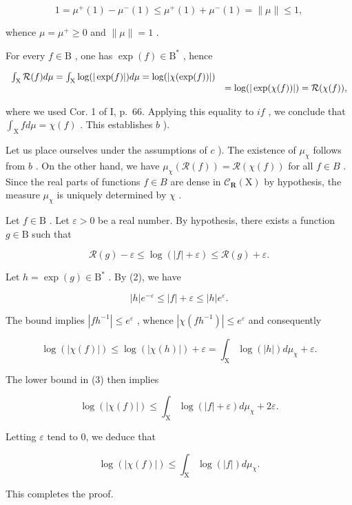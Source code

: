 \[
1 = \mu^ {+} (1) - \mu^ {-} (1) \leqslant \mu^ {+} (1) + \mu^ {-} (1) = \| \mu \| \leqslant 1,
\]

whence \(\mu = \mu^{+} \geqslant 0\) and \(\|\mu\| = 1\) .

For every \(f \in \mathrm{B}\) , one has \(\exp(f) \in \mathrm{B}^*\) , hence

\[
\begin{array}{r l} \int_ {\mathrm{X}} \mathcal {R} (f) d \mu = \int_ {\mathrm{X}} \log (| \exp (f) |) d \mu = \log (| \chi (\exp (f)) |) \\ & = \log (| \exp (\chi (f)) |) = \mathcal {R} (\chi (f)), \end{array}
\]

where we used Cor. 1 of I, p.~66. Applying this equality to \(if\) , we conclude that \(\int_{\mathrm{X}} f d\mu = \chi(f)\) . This establishes \(b\) ).

Let us place ourselves under the assumptions of \(c\) ). The existence of \(\mu_{\chi}\) follows from \(b\) . On the other hand, we have \(\mu_{\chi}(\mathcal{R}(f)) = \mathcal{R}(\chi(f))\) for all \(f \in B\) . Since the real parts of functions \(f \in B\) are dense in \(\mathcal{C}_{\mathbf{R}}(\mathrm{X})\) by hypothesis, the measure \(\mu_{\chi}\) is uniquely determined by \(\chi\) .

Let \(f \in \mathrm{B}\) . Let \(\varepsilon > 0\) be a real number. By hypothesis, there exists a function \(g \in \mathrm{B}\) such that

\[
\mathcal {R} (g) - \varepsilon \leqslant \log (| f | + \varepsilon) \leqslant \mathcal {R} (g) + \varepsilon .\tag{2}
\]

Let \(h = \exp(g) \in \mathrm{B}^*\) . By (2), we have

\[
| h | e ^ {- \varepsilon} \leqslant | f | + \varepsilon \leqslant | h | e ^ {\varepsilon}.\tag{3}
\]

The bound implies \(|fh^{-1}| \leqslant e^{\varepsilon}\) , whence \(|\chi (fh^{-1})| \leqslant e^{\varepsilon}\) and consequently

\[
\log (| \chi (f) |) \leqslant \log (| \chi (h) |) + \varepsilon = \int_ {\mathrm{X}} \log (| h |) d \mu_ {\chi} + \varepsilon .\tag{4}
\]

The lower bound in (3) then implies

\[
\log (| \chi (f) |) \leqslant \int_ {\mathrm{X}} \log (| f | + \varepsilon) d \mu_ {\chi} + 2 \varepsilon .
\]

Letting \(\varepsilon\) tend to 0, we deduce that

\[
\log (| \chi (f) |) \leqslant \int_ {\mathrm{X}} \log (| f |) d \mu_ {\chi}.
\]

This completes the proof.

